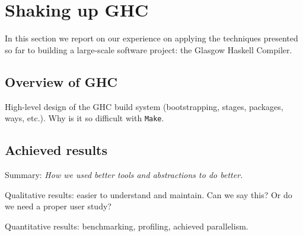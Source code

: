 \section{Shaking up GHC\label{section-shaking-up-ghc}}

In this section we report on our experience on applying the techniques presented
so far to building a large-scale software project: the Glasgow Haskell Compiler.

\subsection{Overview of GHC}

High-level design of the GHC build system (bootstrapping, stages,
packages, ways, etc.). Why is it so difficult with \texttt{Make}.

\subsection{Achieved results}

Summary: \emph{How we used better tools and abstractions to do better.}

Qualitative results: easier to understand and maintain. Can we say this? Or do
we need a proper user study?

Quantitative results: benchmarking, profiling, achieved parallelism. 
